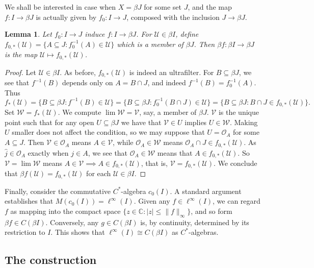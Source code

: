 \documentclass[a4paper,12pt]{article}
\theoremstyle{plain}
\newtheorem{lemma}[proposition]{Lemma}
\theoremstyle{definition}
\newcommand{\mc}[1]{\mathcal{#1}}
\begin{document}
We shall be interested in case when $X = \beta J$ for some set $J$, and the map $f:I\rightarrow \beta J$
is actually given by $f_0:I\rightarrow J$, composed with the inclusion $J\rightarrow\beta J$.

\begin{lemma}\label{lem:beta_map_from_set}
Let $f_0:I\rightarrow J$ induce $f:I\rightarrow\beta J$.  For $\mc U\in\beta I$, define
$f_{0,*}(\mc U) = \{ A\subseteq J : f_0^{-1}(A)\in\mc U \}$ which is a member of $\beta J$.
Then $\beta f:\beta I\rightarrow\beta J$ is the map $\mc U\mapsto f_{0,*}(\mc U)$.
\end{lemma}
\begin{proof}
Let $\mc U \in \beta I$.  As before, $f_{0,*}(\mc U)$ is indeed an ultrafilter.
For $B\subseteq\beta J$, we see that $f^{-1}(B)$ depends only on $A = B \cap J$,
and indeed $f^{-1}(B) = f_0^{-1}(A)$.  Thus
\[ f_*(\mc U) = \{ B\subseteq \beta J : f^{-1}(B) \in\mc U \}
= \{ B\subseteq \beta J : f_0^{-1}(B\cap J) \in\mc U \}
= \{ B\subseteq \beta J : B\cap J \in f_{0,*}(\mc U) \}. \]
Set $\mc W = f_*(\mc U)$.  We compute $\lim\mc W = \mc V$, say, a member of $\beta J$.  $\mc V$ is
the unique point such that for any open $U\subseteq\beta J$ we have that $\mc V\in U$ implies $U\in\mc W$.
Making $U$ smaller does not affect the condition, so we may suppose that $U=\mc O_A$ for some
$A\subseteq J$.  Then $\mc V\in\mc O_A$ means $A\in\mc V$, while $\mc O_A\in\mc W$ means $\mc O_A \cap J
\in f_{0,*}(\mc U)$.  As $\hat j\in \mc O_A$ exactly when $j\in A$, we see that $\mc O_A\in\mc W$ means
that $A\in f_{0,*}(\mc U)$.  So $\mc V = \lim\mc W$ means $A\in\mc V
\implies A\in f_{0,*}(\mc U)$, that is, $\mc V = f_{0,*}(\mc U)$.  We conclude that
$\beta f(\mc U) = f_{0,*}(\mc U)$ for each $\mc U\in\beta I$.
\end{proof}

Finally, consider the commutative $C^*$-algebra $c_0(I)$.  A standard argument establishes that
$M(c_0(I)) = \ell^\infty(I)$.  Given any $f\in \ell^\infty(I)$, we can regard $f$ as mapping into the
compact space $\{ z\in\mathbb C : |z| \leq \|f\|_\infty \}$, and so form $\beta f \in C(\beta I)$.
Conversely, any $g \in C(\beta I)$ is, by continuity, determined by its restriction to $I$.  This
shows that $\ell^\infty(I) \cong C(\beta I)$ as $C^*$-algebras.



\subsection{The construction}
\end{document}
